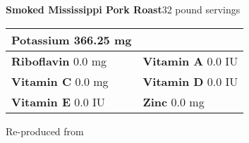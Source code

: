 \documentclass[../recipe-collections/cooking.tex]{subfiles}
\begin{document}
\begin{recipe}{\textbf{Smoked Mississippi Pork Roast}}{32  pound servings}{}
\begin{tabular}{|lr|}
      \multicolumn{1}{|l|}{\textbf{Potassium} \textrm{ 366.25  mg}}     \\ \hline
      \textbf{Riboflavin} \textrm{ 0.0  mg}  &
      \multicolumn{1}{|l|}{\textbf{Vitamin A} \textrm{ 0.0 IU }}        \\ \hline
      \textbf{Vitamin C} \textrm{ 0.0  mg}      &
      \multicolumn{1}{|l|}{\textbf{Vitamin D} \textrm{ 0.0  IU}}         \\ \hline
      \textbf{Vitamin E} \textrm{ 0.0  IU}     &
      \multicolumn{1}{|l|}{\textbf{Zinc} \textrm{ 0.0  mg}}               \\ \hline
  \end{tabular}

  \freeform{}\hrulefill{}

\end{recipe}

Re-produced from  \autocite{HowToBBQRight_PorkRoast_2022}
\end{document}
